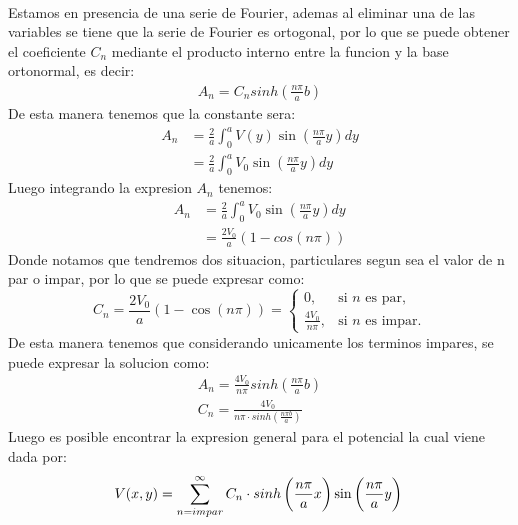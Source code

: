 \documentclass[
  11pt,
  letterpaper,
   addpoints,
   answers
  ]{exam}
\begin{document}
\begin{questions}
\begin{solution}
\begin{enumerate}
\begin{align}
        \end{align}
        Estamos en presencia de una serie de Fourier, ademas al eliminar una de las variables se tiene que la serie de Fourier es ortogonal, por lo que se puede obtener el coeficiente $C_{n}$ mediante el producto interno entre la funcion y la base ortonormal, es decir:
        \begin{align}
            A_{n} = C_{n}sinh\left(\frac{n\pi}{a}b\right)
        \end{align}
        De esta manera tenemos que la constante sera:
        \begin{align}
            A_{n} &= \frac{2}{a}\int_{0}^{a}V(y)\sin\left(\frac{n\pi}{a}y\right)dy\\
            &= \frac{2}{a}\int_{0}^{a}V_{0}\sin\left(\frac{n\pi}{a}y\right)dy
        \end{align}
        Luego integrando la expresion $A_{n}$ tenemos:
        \begin{align}
            A_{n} &= \frac{2}{a}\int_{0}^{a}V_{0}\sin\left(\frac{n\pi}{a}y\right)dy\\
            &= \frac{2V_{0}}{a}(1-cos(n\pi))
        \end{align}
        Donde notamos que tendremos dos situacion, particulares segun sea el valor de n par o impar, por lo que se puede expresar como:
        \begin{equation}
            C_{n} = \frac{2V_{0}}{a}(1 - \cos(n\pi)) = 
            \begin{cases}
            0, & \text{si } n \text{ es par}, \\
            \frac{4V_{0}}{n \pi}, & \text{si } n \text{ es impar}.
            \end{cases}
            \end{equation}
        De esta manera tenemos que considerando unicamente los terminos impares, se puede expresar la solucion como:
        \begin{align}
            A_{n} = \frac{4V_{0}}{n \pi}sinh\left(\frac{n\pi}{a}b\right)\\
            C_{n} = \frac{4V_{0}}{n \pi \cdot sinh\left(\frac{n\pi b}{a}\right)}
        \end{align}         
        Luego es posible encontrar la expresion general para el potencial la cual viene dada por:
        \begin{equation}
            V(x,y) = \sum_{n=impar}^{\infty}C_{n} \cdot sinh\left(\frac{n\pi}{a}x\right)\sin\left(\frac{n\pi}{a}y\right)\\

\end{equation}
\end{enumerate}
\end{solution}
\end{questions}
\end{document}

